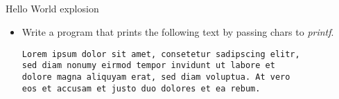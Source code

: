 \subsection{}
\begin{frame}[fragile]{Hello World explosion}
	\begin{itemize}
		\item Write a program that prints the following text by passing chars to \textit{printf}.
		\bigskip
		\begin{lstlisting}[numbers=none]
Lorem ipsum dolor sit amet, consetetur sadipscing elitr,
sed diam nonumy eirmod tempor invidunt ut labore et
dolore magna aliquyam erat, sed diam voluptua. At vero
eos et accusam et justo duo dolores et ea rebum.
\end{lstlisting}
	\end{itemize}
\end{frame}
